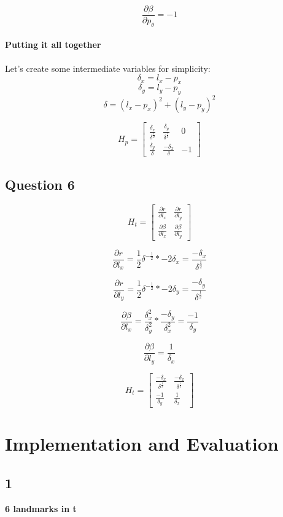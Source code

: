 \documentclass[12pt, a4paper]{article}
\begin{document}
$$\frac{\partial \beta}{\partial p_{\theta}} = -1$$

\paragraph{Putting it all together}

Let's create some intermediate variables for simplicity:
$$\delta_x = l_x - p_x$$
$$\delta_y = l_y - p_y$$
$$\delta = (l_x - p_x)^2 + (l_y - p_y)^2$$


$$H_p = 
\begin{bmatrix}
    \frac{\delta_x}{\delta^{\frac{1}{2}}} & \frac{\delta_y}{\delta^{\frac{1}{2}}}  & 0 \\
    \frac{\delta_y}{\delta} & \frac{-\delta_x}{\delta} & -1
\end{bmatrix}$$

\clearpage
\subsection{Question 6}

$$H_t = 
\begin{bmatrix}
    \frac{\partial r}{\partial l_x} & \frac{\partial r}{\partial l_y} \\
    \frac{\partial \beta}{\partial l_x} & \frac{\partial \beta}{\partial l_y}
\end{bmatrix}$$

$$\frac{\partial r}{\partial l_x} = \frac{1}{2} \delta^{-\frac{1}{2}} * -2\delta_x = \frac{-\delta_x}{\delta^{\frac{1}{2}}}$$

$$\frac{\partial r}{\partial l_y} = \frac{1}{2} \delta^{-\frac{1}{2}} * -2\delta_y = \frac{-\delta_y}{\delta^{\frac{1}{2}}}$$

$$\frac{\partial \beta}{\partial l_x} = \frac{\delta_x^2}{\delta_y^2} * \frac{-\delta_y}{\delta_x^2} = \frac{-1}{\delta_y}$$

$$\frac{\partial \beta}{\partial l_y} = \frac{1}{\delta_x}$$

$$H_t = 
\begin{bmatrix}
    \frac{-\delta_x}{\delta^{\frac{1}{2}}} & \frac{-\delta_x}{\delta^{\frac{1}{2}}} \\
    \frac{-1}{\delta_y} & \frac{1}{\delta_x}
\end{bmatrix}$$

\section{Implementation and Evaluation}
\subsection*{1}
\textbf{6 landmarks in t}
\end{document}

